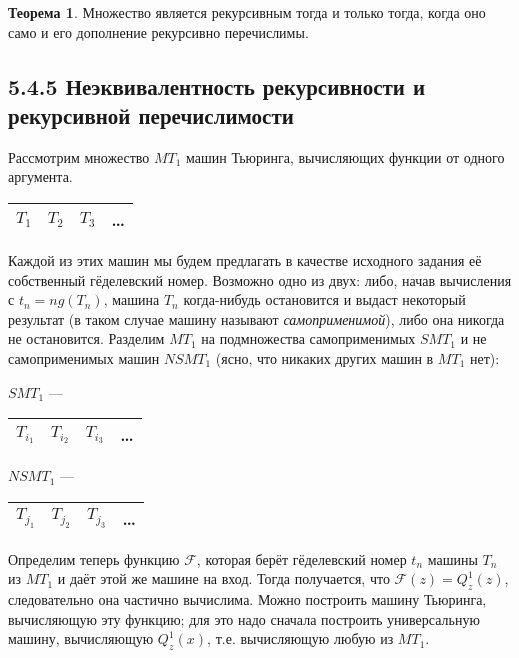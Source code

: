 \documentclass[a4paper, 12pt]{article}  %
\theoremstyle{definition}
\newtheorem*{theorem}{Теорема}
\begin{document}
		\begin{theorem}
			Множество является рекурсивным тогда и только тогда, когда оно само и его дополнение рекурсивно
			перечислимы.
		\end{theorem}
		
	\subsection*{5.4.5 Неэквивалентность рекурсивности и рекурсивной перечислимости}
		
		Рассмотрим множество $MT_1$ машин Тьюринга, вычисляющих функции от одного аргумента.
		\begin{center}
			\begin{tabular}{|c|c|c|c}
				\hline
				$T_1$ & $T_2$ & $T_3$ & \dots  \\
				\hline
			\end{tabular}
		\end{center}
		
		Каждой из этих машин мы будем предлагать в качестве исходного задания её собственный гёделевский
		номер. Возможно одно из двух: либо, начав вычисления с $t_n = ng(T_n)$, машина $T_n$ когда-нибудь
		остановится и выдаст некоторый результат (в таком случае машину называют \textit{самоприменимой}),
		либо она никогда не остановится. Разделим $MT_1$ на подмножества самоприменимых $SMT_1$ и не
		самоприменимых машин $NSMT_1$ (ясно, что никаких других машин в $MT_1$ нет):
		
		\begin{center}
			\begin{multicols}{2}	
				$SMT_1$ ---
				\begin{tabular}{|c|c|c|c}
					\hline
					$T_{i_1}$ & $T_{i_2}$ & $T_{i_3}$ & \dots  \\
					\hline
				\end{tabular}
			
				$NSMT_1$ ---
				\begin{tabular}{|c|c|c|c}
					\hline
					$T_{j_1}$ & $T_{j_2}$ & $T_{j_3}$ & \dots  \\
					\hline
				\end{tabular}
			\end{multicols}
		\end{center}
		
		Определим теперь функцию $\mathscr{F}$, которая берёт гёделевский номер $t_n$ машины $T_n$ из
		$MT_1$ и даёт этой же машине на вход. Тогда получается, что $\mathscr{F}(z) = Q^1_z(z)$,
		следовательно она частично вычислима. Можно построить машину Тьюринга, вычисляющую эту функцию; для
		это надо сначала построить универсальную машину, вычисляющую $Q^1_z(x)$, т.е. вычисляющую любую из
		$MT_1$.
		
\end{document}
